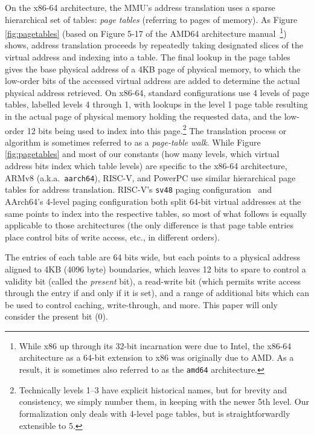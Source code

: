 On the x86-64 architecture, the \textsc{MMU}'s address translation uses a sparse hierarchical set of tables:
\emph{page tables} (referring to pages of memory). As Figure \ref{fig:pagetables} (based on Figure 5-17 of the 
AMD64 architecture manual~\cite{amd64_manual_vol2}\footnote{While x86 up through its 32-bit incarnation were due to Intel,
the x86-64 architecture as a 64-bit extension to x86 was originally due to AMD. As a result, it is sometimes also referred to as the \texttt{amd64} architecture.}) shows, 
address translation proceeds by repeatedly taking designated slices of the virtual address and indexing into a table.
The final lookup in the page tables gives the base physical address of a 4KB page of physical memory, to which the low-order
bits of the accessed virtual address are added to determine the actual physical address retrieved. 
On x86-64, standard configurations use 4 levels of page tables, labelled levels 4 through 1, with lookups in the level 
1 page table resulting in the actual page of physical memory holding the requested data, and the low-order 12 bits 
being used to index into this page.\footnote{Technically levels 1--3 have explicit historical names,
but for brevity and consistency, we simply number them, in keeping with the newer 5th level.
Our formalization
only deals with 4-level page tables, but is straightforwardly extensible to 5.}  
The translation process or algorithm is sometimes referred to as a \emph{page-table walk}. 
While Figure \ref{fig:pagetables} and most of our constants (how many levels, which virtual address bits index which
table levels) are specific to the x86-64 architecture, ARMv8 (a.k.a.\ 
\texttt{aarch64}), RISC-V, and PowerPC use similar hierarchical page tables for address translation.
RISC-V's \texttt{sv48} paging configuration~\cite[\S 4.5]{riscv-privileged} and AArch64's 4-level paging configuration
both split 64-bit virtual addresses at the same points to index into the respective tables, so most of what follows
is equally applicable to those architectures (the only difference is that page table entries place control bits of write access, etc.,
in different orders).

The entries of each table are 64 bits wide, but each points to a physical address aligned to 4KB (4096 byte) boundaries, which leaves 12 bits to spare to 
control a validity bit (called the \emph{present} bit), a read-write bit (which permits write access through the entry if and only if it is set), 
and a range of additional bits which can be used to control caching, write-through, and more. This paper will only consider the present bit (0).

